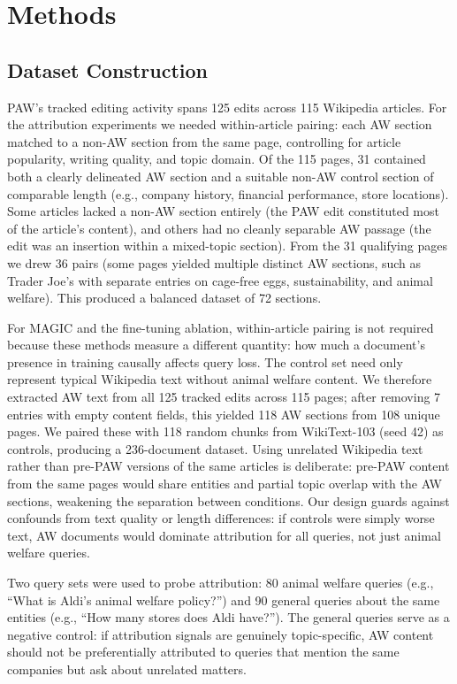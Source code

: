 \documentclass{article}
\begin{document}
\section{Methods}

\subsection{Dataset Construction}

PAW's tracked editing activity spans 125 edits across 115 Wikipedia articles. For the attribution experiments we needed within-article pairing: each AW section matched to a non-AW section from the same page, controlling for article popularity, writing quality, and topic domain. Of the 115 pages, 31 contained both a clearly delineated AW section and a suitable non-AW control section of comparable length (e.g., company history, financial performance, store locations). Some articles lacked a non-AW section entirely (the PAW edit constituted most of the article's content), and others had no cleanly separable AW passage (the edit was an insertion within a mixed-topic section). From the 31 qualifying pages we drew 36 pairs (some pages yielded multiple distinct AW sections, such as Trader Joe's with separate entries on cage-free eggs, sustainability, and animal welfare). This produced a balanced dataset of 72 sections.

For MAGIC and the fine-tuning ablation, within-article pairing is not required because these methods measure a different quantity: how much a document's presence in training causally affects query loss. The control set need only represent typical Wikipedia text without animal welfare content. We therefore extracted AW text from all 125 tracked edits across 115 pages; after removing 7 entries with empty content fields, this yielded 118 AW sections from 108 unique pages. We paired these with 118 random chunks from WikiText-103 (seed 42) as controls, producing a 236-document dataset. Using unrelated Wikipedia text rather than pre-PAW versions of the same articles is deliberate: pre-PAW content from the same pages would share entities and partial topic overlap with the AW sections, weakening the separation between conditions. Our design guards against confounds from text quality or length differences: if controls were simply worse text, AW documents would dominate attribution for all queries, not just animal welfare queries.

Two query sets were used to probe attribution: 80 animal welfare queries (e.g., ``What is Aldi's animal welfare policy?'') and 90 general queries about the same entities (e.g., ``How many stores does Aldi have?''). The general queries serve as a negative control: if attribution signals are genuinely topic-specific, AW content should not be preferentially attributed to queries that mention the same companies but ask about unrelated matters.
\end{document}
